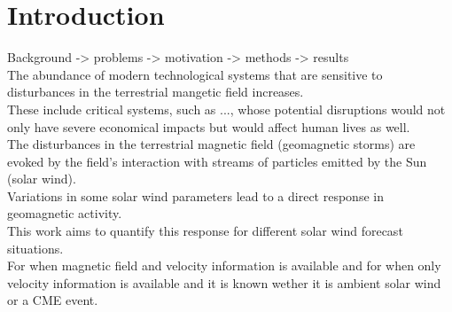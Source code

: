 
\chapter{Introduction}
\label{chap:introduction}

Background -> problems -> motivation -> methods -> results\\



The abundance of modern technological systems that are sensitive to disturbances in the terrestrial mangetic field increases.\\
These include critical systems, such as ..., whose potential disruptions would not only have severe economical impacts but would affect human lives as well.\\
The disturbances in the terrestrial magnetic field (geomagnetic storms) are evoked by the field's interaction with streams of particles emitted by the Sun (solar wind).\\
Variations in some solar wind parameters lead to a direct response in geomagnetic activity.\\
This work aims to quantify this response for different solar wind forecast situations.\\
For when magnetic field and velocity information is available and for when only velocity information is available and it is known wether it is ambient solar wind or a CME event.\\


